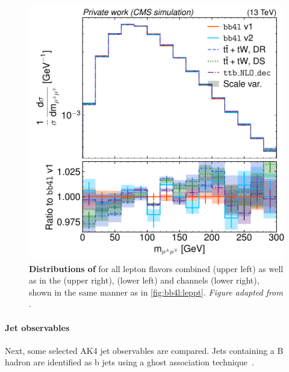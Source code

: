 \begin{figure}[tp]
    \hfill
    \includegraphics[width=0.49 \textwidth]{figures/bb4l/generators/MC_TTBAR_DILEP_SPINDENSITY_mll_mumu.pdf}
    \caption{\textbf{Distributions of \mll} for all lepton flavors combined (upper left) as well as in the \emu (upper right), \ee (lower left) and \mumu channels (lower right), shown in the same manner as in \cref{fig:bb4l:leppt}. \textit{Figure adapted from }.}
    \label{fig:bb4l:mll}
\end{figure}

\paragraph{Jet observables} Next, some selected AK4 jet observables are compared. 
Jets containing a B hadron are identified as b jets using a ghost association technique~\cite{Cacciari:2007fd,Cacciari:2008gn}. 

